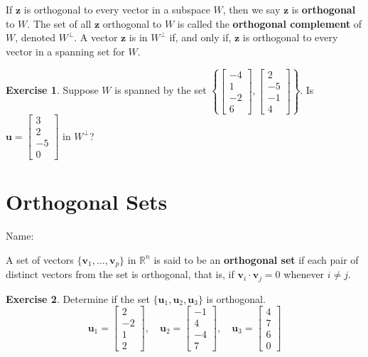 \documentclass[10pt]{book}
\newcommand{\boxcolor}{gray!30}
\newenvironment{boxme}{\begin{mdframed}[backgroundcolor=\boxcolor,linewidth=0pt,nobreak=true]}{\end{mdframed}}
\newenvironment{boxdef}{\begin{mdframed}[backgroundcolor=\boxcolor,linewidth=0pt,nobreak=true]}{\end{mdframed}}
\theoremstyle{definition}
\newtheorem{exercise}{Exercise}[section]
\newcommand{\name}[1][2.5in]{\vspace{-2.3em}\hfill Name: \underline{\hspace{#1}}}
\newcommand{\R}{\mathbb{R}}
\newcommand{\vect}[1]{\ensuremath{\boldsymbol{\mathbf{#1}}}}
\newcommand{\vectsetvp}{\{\vect{v}_1,\ldots,\vect{v}_p\}}
\begin{document}
\begin{boxdef}
	If $\vect{z}$ is orthogonal to every vector in a subspace $W$, then we say $\vect{z}$ is \textbf{orthogonal} to $W$. The set of all $\vect{z}$ orthogonal to $W$ is called the \textbf{orthogonal complement} of $W$, denoted $W^\perp$. A vector $\vect{z}$ is in $W^\perp$ if, and only if, $\vect{z}$ is orthogonal to every vector in a spanning set for $W$.
\end{boxdef}

\begin{exercise} %
	Suppose $W$ is spanned by the set $\left\{ \begin{bmatrix}-4\\1\\-2\\6\end{bmatrix},\begin{bmatrix}2\\-5\\-1\\4\end{bmatrix} \right\}$. Is $\vect{u}=\begin{bmatrix}3\\2\\-5\\0\end{bmatrix}$ in $W^\perp$?
\end{exercise}
\vfill


\newpage


\section{Orthogonal Sets}
\name

\begin{boxme}
	A set of vectors $\vectsetvp$ in $\R^n$ is said to be an \textbf{orthogonal set} if each pair of distinct vectors from the set is orthogonal, that is, if $\vect{v}_i\cdot\vect{v}_j=0$ whenever $i\neq j$.
\end{boxme}


\begin{exercise} %
	Determine if the set $\{\vect{u}_1,\vect{u}_2,\vect{u}_3\}$ is orthogonal.
	$$ \vect{u}_1 = \begin{bmatrix}2\\-2\\1\\2\end{bmatrix}, \quad
	\vect{u}_2 = \begin{bmatrix}-1\\4\\-4\\7\end{bmatrix}, \quad
	\vect{u}_3 = \begin{bmatrix}4\\7\\6\\0\end{bmatrix} $$
\end{exercise}
\vfill
\end{document}
